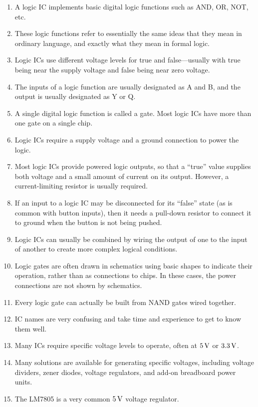 \begin{enumerate}
\item A logic IC implements basic digital logic functions such as AND, OR, NOT, etc.
\item These logic functions refer to essentially the same ideas that they mean in ordinary language, and exactly what they mean in formal logic.
\item Logic ICs use different voltage levels for true and false---usually with true being near the supply voltage and false being near zero voltage.
\item The inputs of a logic function are usually designated as A and B, and the output is usually designated as Y or Q.
\item A single digital logic function is called a gate.  Most logic ICs have more than one gate on a single chip.
\item Logic ICs require a supply voltage and a ground connection to power the logic.
\item Most logic ICs provide powered logic outputs, so that a ``true'' value supplies both voltage and a small amount of current on its output.  However, a current-limiting resistor is usually required.
\item If an input to a logic IC may be disconnected for its ``false'' state (as is common with button inputs), then it needs a pull-down resistor to connect it to ground when the button is not being pushed.
\item Logic ICs can usually be combined by wiring the output of one to the input of another to create more complex logical conditions.
\item Logic gates are often drawn in schematics using basic shapes to indicate their operation, rather than as connections to chips.  In these cases, the power connections are not shown by schematics.
\item Every logic gate can actually be built from NAND gates wired together.
\item IC names are very confusing and take time and experience to get to know them well.
\item Many ICs require specific voltage levels to operate, often at $5\,\si{\volt}$ or $3.3\,\si{\volt}$.
\item Many solutions are available for generating specific voltages, including voltage dividers, zener diodes, voltage regulators, and add-on breadboard power units.
\item The LM7805 is a very common $5\,\si{\volt}$ voltage regulator.
\end{enumerate}

